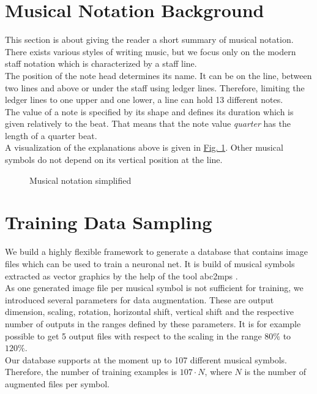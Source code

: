 \documentclass{llncs}
\begin{document}
\section{Musical Notation Background}
This section is about giving the reader a short summary of musical notation. There exists various styles of writing music, but we focus only on the modern staff notation which is characterized by a staff line. \\
The position of the note head determines its name. It can be on the line, between two lines and above or under the staff using ledger lines. Therefore, limiting the ledger lines to one upper and one lower, a line can hold 13 different notes. \\
The value of a note is specified by its shape and defines its duration which is given relatively to the beat. That means that the note value \textit{quarter} has the length of a quarter beat. \\
A visualization of the explanations above is given in \hyperref[musical_notation]{Fig. 1}. 
Other musical symbols do not depend on its vertical position at the line. 


\begin{figure}
 
 \caption{Musical notation simplified}
 \label{musical_notation}
\end{figure}

\section{Training Data Sampling}
We build a highly flexible framework to generate a database that contains image files which can be used to train a neuronal net. It is build of musical symbols extracted as vector graphics by the help of the tool abc2mps \citet{abc2mps}. \\
As one generated image file per musical symbol is not sufficient for training, we introduced several parameters for data augmentation. These are output dimension, scaling, rotation, horizontal shift, vertical shift and the respective number of outputs in the ranges defined by these parameters. It is for example possible to get 5 output files with respect to the scaling in the range $80\%$ to $120\%$. \\
Our database supports at the moment up to 107 different musical symbols. Therefore, the number of training examples is $107 \cdot N$, where $N$ is the number of augmented files per symbol. 
\end{document}
